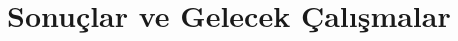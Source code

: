 \documentclass{llncs}
\begin{document}
















\section{Sonuçlar ve Gelecek Çalışmalar}








\end{document}
